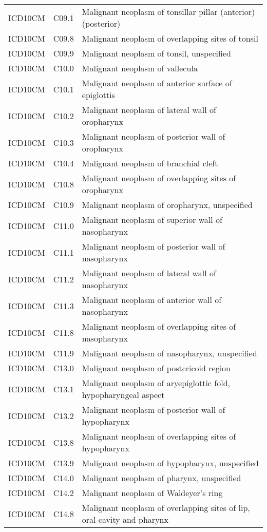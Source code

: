 \begin{longtable}{p{}p{}p{}}
  ICD10CM & C09.1 & Malignant neoplasm of tonsillar pillar (anterior) (posterior) \\ 
  ICD10CM & C09.8 & Malignant neoplasm of overlapping sites of tonsil \\ 
  ICD10CM & C09.9 & Malignant neoplasm of tonsil, unspecified \\ 
  ICD10CM & C10.0 & Malignant neoplasm of vallecula \\ 
  ICD10CM & C10.1 & Malignant neoplasm of anterior surface of epiglottis \\ 
  ICD10CM & C10.2 & Malignant neoplasm of lateral wall of oropharynx \\ 
  ICD10CM & C10.3 & Malignant neoplasm of posterior wall of oropharynx \\ 
  ICD10CM & C10.4 & Malignant neoplasm of branchial cleft \\ 
  ICD10CM & C10.8 & Malignant neoplasm of overlapping sites of oropharynx \\ 
  ICD10CM & C10.9 & Malignant neoplasm of oropharynx, unspecified \\ 
  ICD10CM & C11.0 & Malignant neoplasm of superior wall of nasopharynx \\ 
  ICD10CM & C11.1 & Malignant neoplasm of posterior wall of nasopharynx \\ 
  ICD10CM & C11.2 & Malignant neoplasm of lateral wall of nasopharynx \\ 
  ICD10CM & C11.3 & Malignant neoplasm of anterior wall of nasopharynx \\ 
  ICD10CM & C11.8 & Malignant neoplasm of overlapping sites of nasopharynx \\ 
  ICD10CM & C11.9 & Malignant neoplasm of nasopharynx, unspecified \\ 
  ICD10CM & C13.0 & Malignant neoplasm of postcricoid region \\ 
  ICD10CM & C13.1 & Malignant neoplasm of aryepiglottic fold, hypopharyngeal aspect \\ 
  ICD10CM & C13.2 & Malignant neoplasm of posterior wall of hypopharynx \\ 
  ICD10CM & C13.8 & Malignant neoplasm of overlapping sites of hypopharynx \\ 
  ICD10CM & C13.9 & Malignant neoplasm of hypopharynx, unspecified \\ 
  ICD10CM & C14.0 & Malignant neoplasm of pharynx, unspecified \\ 
  ICD10CM & C14.2 & Malignant neoplasm of Waldeyer's ring \\ 
  ICD10CM & C14.8 & Malignant neoplasm of overlapping sites of lip, oral cavity and pharynx \\ 

\end{longtable}
